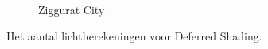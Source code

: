 \begin{figure}[t]
\begin{minipage}[t]{0.5\textwidth}
\begin{adjustbox}{minipage=\textwidth, scale=0.55}
\begin{subfigure}[b]{1.6\textwidth}
      \vspace{4pt}
      \label{fig:hs-compare-frames:lc:alley}
    \end{subfigure}
  \end{adjustbox} \\
  \begin{adjustbox}{minipage=\textwidth, scale=0.55}
    \begin{subfigure}[b]{1.6\textwidth}
      \centering
      \def\svgwidth{\textwidth}
      
      \caption{Ziggurat City}
      \label{fig:hs-compare-frames:lc:city}
    \end{subfigure}
  \end{adjustbox}
  \caption{\small Het aantal lichtberekeningen voor Deferred Shading.}
  \label{fig:hs-compare-frames:lc}
  \end{minipage}%
\end{figure}
